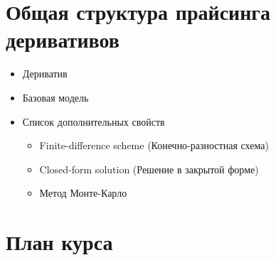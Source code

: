 \documentclass{article}
\begin{document}
\section{Общая структура прайсинга деривативов}

\begin{itemize}
 
  \item Дериватив
  \item Базовая модель
  \item Список дополнительных свойств
  
    \begin{itemize}
    \item Finite-difference scheme (Конечно-разностная схема)
    \item Closed-form solution (Решение в закрытой форме)
    \item Метод Монте-Карло
    \end{itemize}

\end{itemize}
\section{План курса}
  
\end{document}
